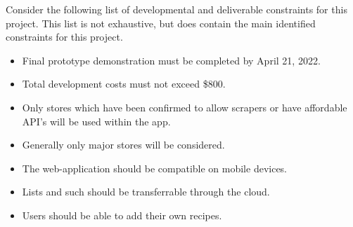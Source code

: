%
%
%
%
%
Consider the following list of developmental and deliverable constraints for this project.  This list is not exhaustive, but does contain the main identified constraints for this project.
\begin{itemize}
  \item Final prototype demonstration must be completed by April 21, 2022.
  \item Total development costs must not exceed \$800.
  \item Only stores which have been confirmed to allow scrapers or have affordable API's will be used within the app.
  \item Generally only major stores will be considered.
  \item The web-application should be compatible on mobile devices.
  \item Lists and such should be transferrable through the cloud.
  \item Users should be able to add their own recipes.
\end{itemize}
